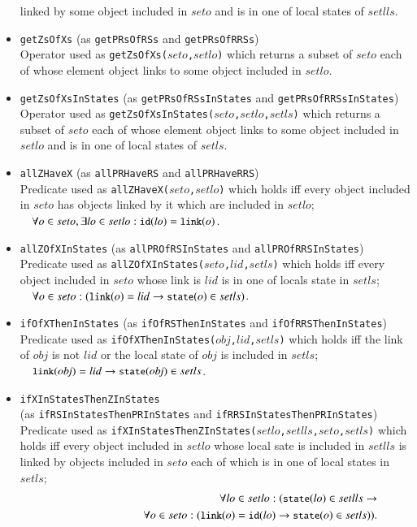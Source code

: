 \documentclass[12pt]{report}
\newcommand{\ra}{\rightarrow}
\newcommand{\mbstt}[1]{\mbox{\small{\tt {#1}}}}
\newcommand{\stt}[1]{{\small{\tt {#1}}}}
\begin{document}
\begin{itemize}
  linked by some object included in $seto$ and is in one of local
  states of $setlls$.
\item \stt{getZsOfXs} (as \stt{getPRsOfRSs} and \stt{getPRsOfRRSs})\\
  Operator used as \stt{getZsOfXs($seto$,$setlo$)} which returns a
  subset of $seto$ each of whose element object links to some object
  included in $setlo$.
\item \stt{getZsOfXsInStates} (as \stt{getPRsOfRSsInStates} and \stt{getPRsOfRRSsInStates})\\
  Operator used as \stt{getZsOfXsInStates($seto$,$setlo$,$setls$)}
  which returns a subset of $seto$ each of whose element object links
  to some object included in $setlo$ and is in one of local states of
  $setls$.
\item \stt{allZHaveX} (as \stt{allPRHaveRS} and \stt{allPRHaveRRS})\\
  Predicate used as \stt{allZHaveX($seto$,$setlo$)} which holds iff
  every object included in $seto$ has objects linked by it
  which are included in $setlo$;\\$~~~~\forall o\in seto,\exists lo\in
  setlo:\mbstt{id}(lo)=\mbstt{link}(o)$.
\item \stt{allZOfXInStates} (as \stt{allPROfRSInStates} and \stt{allPROfRRSInStates})\\
  Predicate used as \stt{allZOfXInStates($seto$,$lid$,$setls$)} which
  holds iff every object included in $seto$ whose link is $lid$
  is in one of locals state in $setls$;\\$~~~~\forall o\in
  seto:(\mbstt{link}(o)=lid\ra\mbstt{state}(o)\in setls)$.
\item \stt{ifOfXThenInStates} (as \stt{ifOfRSThenInStates} and \stt{ifOfRRSThenInStates})\\
  Predicate used as \stt{ifOfXThenInStates($\mathit{obj}$,$lid$,$setls$)} which
  holds iff the link of $\mathit{obj}$ is not $lid$ or the local state of
  $\mathit{obj}$ is included in
  $setls$;\\$~~~~\mbstt{link}(\mathit{obj})=lid\ra\mbstt{state}(\mathit{obj})\in setls$.
\item \stt{ifXInStatesThenZInStates}\\
(as \stt{ifRSInStatesThenPRInStates} and \stt{ifRRSInStatesThenPRInStates})\\
  Predicate used as
  \stt{ifXInStatesThenZInStates($setlo$,$setlls$,$seto$,$setls$)}
  which holds iff every object included in $setlo$ whose local
  sate is included in $setlls$ is linked by objects included in $seto$
  each of which is in one of local states in $setls$;
  \vspace{-0.3cm}
  \begin{eqnarray*}
    &&\forall lo\in setlo:(\mbstt{state}(lo)\in setlls\ra\\
    &&~~~~~~~~~~~~~~~~~~~~~~~~~~~~
    \forall o\in seto: (\mbstt{link}(o)=\mbstt{id}(lo)\ra\mbstt{state}(o)\in setls)).
  \end{eqnarray*}
\end{itemize}
\end{document}
